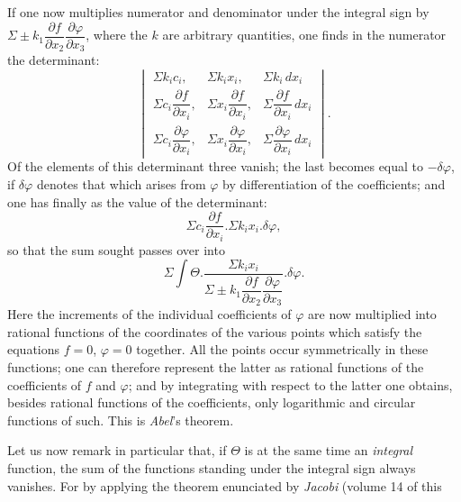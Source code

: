\documentclass{article}
\begin{document}
If one now multiplies numerator and denominator under the integral sign by $\Sigma\pm k_{1}\dfrac{\partial f}{\partial x_{2}}\dfrac{\partial \varphi}{\partial x_{3}}$, where the $k$ are arbitrary quantities, one finds in the numerator the determinant:
\[
\begin{vmatrix}
\Sigma k_{i}c_{i}, & \Sigma k_{i}x_{i}, & \Sigma k_{i}\,dx_{i} \\[4pt]
\Sigma c_{i}\dfrac{\partial f}{\partial x_{i}}, & \Sigma x_{i}\dfrac{\partial f}{\partial x_{i}}, & \Sigma \dfrac{\partial f}{\partial x_{i}}\,dx_{i} \\[4pt]
\Sigma c_{i}\dfrac{\partial \varphi}{\partial x_{i}}, & \Sigma x_{i}\dfrac{\partial \varphi}{\partial x_{i}}, & \Sigma \dfrac{\partial \varphi}{\partial x_{i}}\,dx_{i}
\end{vmatrix}.
\]
Of the elements of this determinant three vanish; the last becomes equal to $-\delta\varphi$, if $\delta\varphi$ denotes that which arises from $\varphi$ by differentiation of the coefficients; and one has finally as the value of the determinant:
\[ \Sigma c_{i}\frac{\partial f}{\partial x_{i}}.\Sigma k_{i}x_{i}.\delta\varphi, \]
so that the sum sought passes over into
\[ \Sigma\int \Theta.\frac{\Sigma k_{i}x_{i}}{\Sigma\pm k_{1}\dfrac{\partial f}{\partial x_{2}}\dfrac{\partial \varphi}{\partial x_{3}}}.\delta\varphi. \]
Here the increments of the individual coefficients of $\varphi$ are now multiplied into rational functions of the coordinates of the various points which satisfy the equations $f = 0$, $\varphi = 0$ together. All the points occur symmetrically in these functions; one can therefore represent the latter as rational functions of the coefficients of $f$ and $\varphi$; and by integrating with respect to the latter one obtains, besides rational functions of the coefficients, only logarithmic and circular functions of such. This is \emph{Abel}'s theorem.

Let us now remark in particular that, if $\Theta$ is at the same time an \emph{integral} function, the sum of the functions standing under the integral sign always vanishes. For by applying the theorem enunciated by \emph{Jacobi} (volume 14 of this
\end{document}
